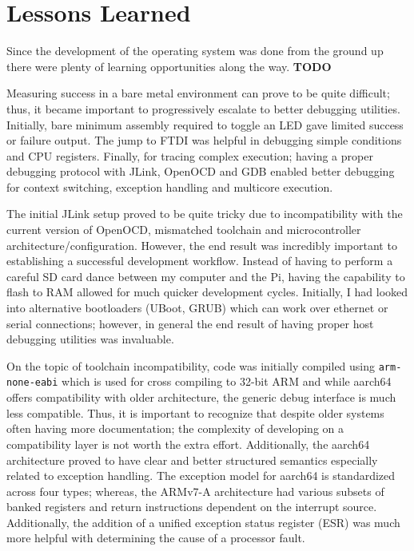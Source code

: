 \documentclass[11pt]{article}
\begin{document}
\section{Lessons Learned}
\label{sec:lessons}
Since the development of the operating system was done from the ground up there were plenty of learning opportunities along the way. 
\textbf{TODO} 

Measuring success in a bare metal environment can prove to be quite difficult; thus, it became important to progressively escalate to better debugging utilities.  Initially, bare minimum assembly required to toggle an LED gave limited success or failure output.  The jump to FTDI was helpful in debugging simple conditions and CPU registers.  Finally, for tracing complex execution; having a proper debugging protocol with JLink, OpenOCD and GDB enabled better debugging for context switching, exception handling and multicore execution.

The initial JLink setup proved to be quite tricky due to incompatibility with the current version of OpenOCD, mismatched toolchain and microcontroller architecture/configuration.  However, the end result was incredibly important to establishing a successful development workflow.  Instead of having to perform a careful SD card dance between my computer and the Pi, having the capability to flash to RAM allowed for much quicker development cycles.  Initially, I had looked into alternative bootloaders (UBoot, GRUB) which can work over ethernet or serial connections; however, in general the end result of having proper host debugging utilities was invaluable.

On the topic of toolchain incompatibility, code was initially compiled using \texttt{arm-none-eabi} which is used for cross compiling to 32-bit ARM and while aarch64 offers compatibility with older architecture, the generic debug interface is much less compatible.  Thus, it is important to recognize that despite older systems often having more documentation; the complexity of developing on a compatibility layer is not worth the extra effort.  Additionally, the aarch64 architecture proved to have clear and better structured semantics especially related to exception handling.  The exception model for aarch64 is standardized across four types; whereas, the ARMv7-A architecture had various subsets of banked registers and return instructions dependent on the interrupt source.  Additionally, the addition of a unified exception status register (ESR) was much more helpful with determining the cause of a processor fault.
\end{document}
